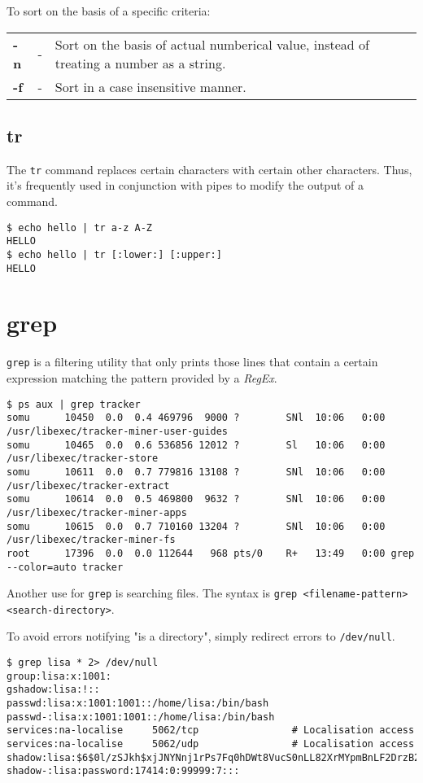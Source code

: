 \noindent
To sort on the basis of a specific criteria:

\begin{tabular}{lcp{}}
	\textbf{-n} &- &Sort on the basis of actual numberical value, instead of treating a number as a string. \\
	\textbf{-f} &- &Sort in a case insensitive manner. \\
\end{tabular}

\subsection{tr}
The \verb|tr| command replaces certain characters with certain other characters. Thus, it's frequently used in conjunction with pipes to modify the output of a command. 

\begin{verbatim}
$ echo hello | tr a-z A-Z
HELLO
$ echo hello | tr [:lower:] [:upper:]
HELLO
\end{verbatim}

\section{grep}
\verb|grep| is a filtering utility that only prints those lines that contain a certain expression matching the pattern provided by a \textit{RegEx}.

\begin{verbatim}
$ ps aux | grep tracker
somu      10450  0.0  0.4 469796  9000 ?        SNl  10:06   0:00 /usr/libexec/tracker-miner-user-guides
somu      10465  0.0  0.6 536856 12012 ?        Sl   10:06   0:00 /usr/libexec/tracker-store
somu      10611  0.0  0.7 779816 13108 ?        SNl  10:06   0:00 /usr/libexec/tracker-extract
somu      10614  0.0  0.5 469800  9632 ?        SNl  10:06   0:00 /usr/libexec/tracker-miner-apps
somu      10615  0.0  0.7 710160 13204 ?        SNl  10:06   0:00 /usr/libexec/tracker-miner-fs
root      17396  0.0  0.0 112644   968 pts/0    R+   13:49   0:00 grep --color=auto tracker
\end{verbatim}

\noindent
Another use for \verb|grep| is searching files. The syntax is \verb|grep <filename-pattern> <search-directory>|.

To avoid errors notifying "is a directory", simply redirect errors to \verb|/dev/null|.

\begin{verbatim}
$ grep lisa * 2> /dev/null
group:lisa:x:1001:
gshadow:lisa:!::
passwd:lisa:x:1001:1001::/home/lisa:/bin/bash
passwd-:lisa:x:1001:1001::/home/lisa:/bin/bash
services:na-localise     5062/tcp                # Localisation access
services:na-localise     5062/udp                # Localisation access
shadow:lisa:$6$0l/zSJkh$xjJNYNnj1rPs7Fq0hDWt8VucS0nLL82XrMYpmBnLF2DrzB2npFvCwxM9MJEHgCHCwvabCgEA17LK2aU0h9FIT/:17414:0:99999:7:::
shadow-:lisa:password:17414:0:99999:7:::
\end{verbatim}

